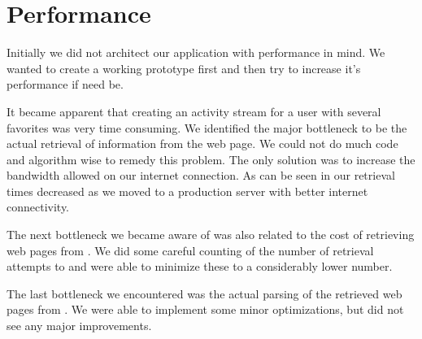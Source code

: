 \section{Performance}
\label{section:implementation.performance}

Initially we did not architect our application with performance in mind. We
wanted to create a working prototype first and then try to increase it's
performance if need be.


It became apparent that creating an activity stream for a user with several
favorites was very time consuming. We identified the major bottleneck to be
the actual retrieval of information from the \urort{} web page. We could not
do much code and algorithm wise to remedy this problem. The only solution
was to increase the bandwidth allowed on our internet connection.
As can be seen in
our retrieval times decreased as we moved to a production server with
better internet connectivity.

The next bottleneck we became aware of was also related to the cost of
retrieving web pages from \urort{}. We did some careful counting of the number
of retrieval attempts to \urort{} and were able to minimize these to a
considerably lower number.

The last bottleneck we encountered was the actual parsing of the retrieved web
pages from \urort{}. We were able to implement some minor optimizations, but
did not see any major improvements.

